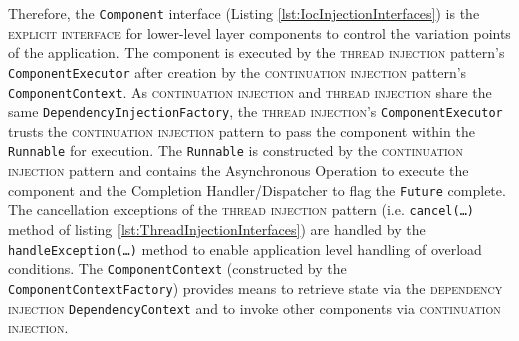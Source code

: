 \documentclass[prodmode]{style/acmlarge}
\begin{document}
Therefore, the \texttt{Component} interface (Listing
\ref{lst:IocInjectionInterfaces}) is the \textsc{explicit interface} for
lower-level layer components to control the variation points of the application.
 The component is executed by the \textsc{thread injection} pattern's
\texttt{ComponentExecutor} after creation by the \textsc{continuation injection}
pattern's \texttt{ComponentContext}.  As \textsc{continuation injection} and
\textsc{thread injection} share the same \texttt{DependencyInjectionFactory},
the \textsc{thread injection}'s \texttt{ComponentExecutor} trusts the
\textsc{continuation injection} pattern to pass the component within the
\texttt{Runnable} for execution.  The \texttt{Runnable} is constructed by the
\textsc{continuation injection} pattern and contains the Asynchronous Operation
to execute the component and the Completion Handler/Dispatcher to flag the
\texttt{Future} complete.  The cancellation exceptions of the \textsc{thread
injection} pattern (i.e. \texttt{cancel(\ldots)} method of listing
\ref{lst:ThreadInjectionInterfaces}) are handled by the
\texttt{handleException(\ldots)} method to enable application level handling of
overload conditions.  The \texttt{ComponentContext} (constructed by the
\texttt{ComponentContextFactory}) provides means to retrieve state via the
\textsc{dependency injection} \texttt{Dependency\-Context} and to invoke other
components via \textsc{continuation injection}.
\end{document}
